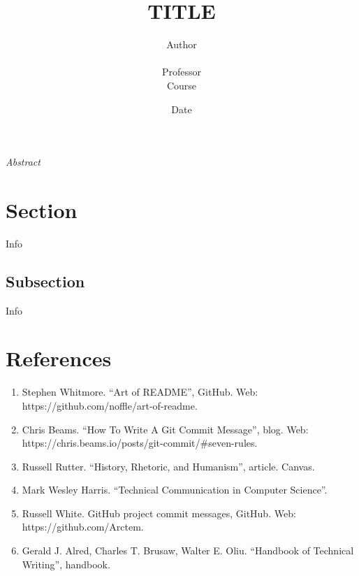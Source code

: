 \documentclass{article}
\title{\LARGE \bf
TITLE\\
}
\author{
Author\rule[25pt]{0pt}{0pt}\\
Professor\\
Course
}
\begin{document}
\maketitle

\bigskip
\date{Date}
\bigskip

\begin{multicols}{2}

\textit{Abstract}

\section{Section}
\label{ref:section_ref}
\hspace{10mm} Info

\subsection{Subsection}
\label{ref:subsection_ref}
\hspace{10mm} Info

\section{References}
\label{ref:references}
\begin{enumerate}
\item Stephen Whitmore. ``Art of README'', GitHub. Web: https://github.com/noffle/art-of-readme.
\item Chris Beams. ``How To Write A Git Commit Message'', blog. Web: https://chris.beams.io/posts/git-commit/\#seven-rules.
\item Russell Rutter. ``History, Rhetoric, and Humanism'', article. Canvas.
\item Mark Wesley Harris. ``Technical Communication in Computer Science''.
\item Russell White. GitHub project commit messages, GitHub. Web: https://github.com/Arctem.
\item Gerald J. Alred, Charles T. Brusaw, Walter E. Oliu. ``Handbook of Technical Writing'', handbook.
\end{enumerate}
\end{multicols}
\end{document}
